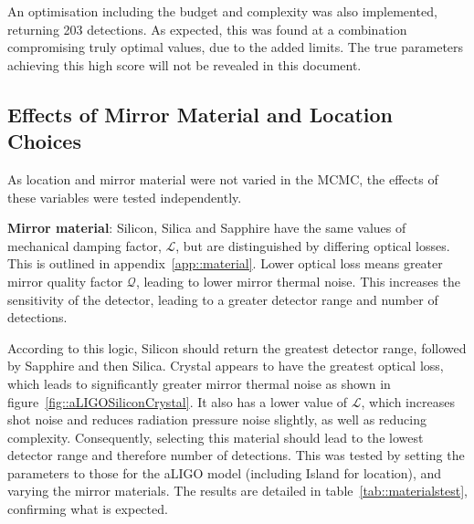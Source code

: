 \documentclass{article}
\begin{document}
An optimisation including the budget and complexity was also
implemented, returning 203 detections. As expected, this was found at
a combination compromising truly optimal values, due to the added
limits. The true parameters achieving this high score will not be
revealed in this document. 

\subsection{Effects of Mirror Material and Location Choices}
As location and mirror material were not varied in the MCMC, the
effects of these variables were tested independently. 

\textbf{Mirror material}: Silicon, Silica and Sapphire have the same
values of mechanical damping factor, $\mathcal{L}$, but are
distinguished by differing optical losses. This is outlined in
appendix~\ref{app::material}. Lower optical loss means greater mirror
quality factor $\mathcal{Q}$, leading to lower mirror thermal
noise. This increases the sensitivity of the detector, leading to a
greater detector range and number of detections. 

According to this logic, Silicon should return the greatest detector
range, followed by Sapphire and then Silica. Crystal appears to have
the greatest optical loss, which leads to significantly greater mirror
thermal noise as shown in figure~\ref{fig::aLIGOSiliconCrystal}. It
also has a lower value of $\mathcal{L}$, which increases shot noise
and reduces radiation pressure noise slightly, as well as reducing
complexity. Consequently, selecting this material should lead to the
lowest detector range and therefore number of detections. This was
tested by setting the parameters to those for the aLIGO model
(including Island for location), and varying the mirror materials. The
results are detailed in table~\ref{tab::materialstest}, confirming
what is expected. 
\end{document}
